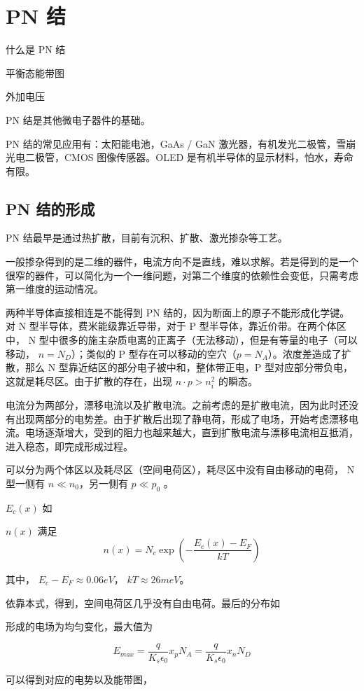 \documentclass[cn,11pt,chinese,black,simple]{../elegantbook}
\begin{document}
\fi 
\def\chapname{01pnjunction}

\chapter{PN 结}

\begin{introduction}
    \item 什么是 PN 结
    \item 平衡态能带图
    \item 外加电压
\end{introduction}

PN 结是其他微电子器件的基础。

PN 结的常见应用有：太阳能电池，GaAs / GaN 激光器，有机发光二极管，雪崩光电二极管，CMOS 图像传感器。OLED 是有机半导体的显示材料，怕水，寿命有限。

\section{PN 结的形成}

PN 结最早是通过热扩散，目前有沉积、扩散、激光掺杂等工艺。

一般掺杂得到的是二维的器件，电流方向不是直线，难以求解。若是得到的是一个很窄的器件，可以简化为一个一维问题，对第二个维度的依赖性会变低，只需考虑第一维度的运动情况。

两种半导体直接相连是不能得到 PN 结的，因为断面上的原子不能形成化学键。对 N 型半导体，费米能级靠近导带，对于 P 型半导体，靠近价带。在两个体区中， N 型中很多的施主杂质电离的正离子（无法移动），但是有等量的电子（可以移动， \(n = N_D\)）；类似的 P 型存在可以移动的空穴（\(p = N_A\)）。浓度差造成了扩散，那么 N 型靠近结区的部分电子被中和，整体带正电，P 型对应部分带负电，这就是耗尽区。由于扩散的存在，出现 \(n \cdot p > n_i^2\) 的瞬态。

电流分为两部分，漂移电流以及扩散电流。之前考虑的是扩散电流，因为此时还没有出现两部分的电势差。由于扩散后出现了静电荷，形成了电场，开始考虑漂移电流。电场逐渐增大，受到的阻力也越来越大，直到扩散电流与漂移电流相互抵消，进入稳态，即完成形成过程。

可以分为两个体区以及耗尽区（空间电荷区），耗尽区中没有自由移动的电荷， N 型一侧有 \(n \ll n_0\)，另一侧有 \(p \ll p_0\) 。

\(E_c(x)\) 如


\(n(x)\) 满足 \[n(x) = N_c \exp(-\frac{E_c(x)-E_F}{k T})\] 

其中， \(E_c - E_F \approx 0.06 eV\)， \(k T \approx 26 meV\)。

依靠本式，得到，空间电荷区几乎没有自由电荷。最后的分布如


形成的电场为均匀变化，最大值为 

\[E_{max} = \frac{q}{K_s \epsilon_0} x_p N_A = \frac{q}{K_s \epsilon_0} x_n N_D\]

可以得到对应的电势以及能带图，




\let\chapname\undefined
\ifx\mainclass\undefined
\end{document}
